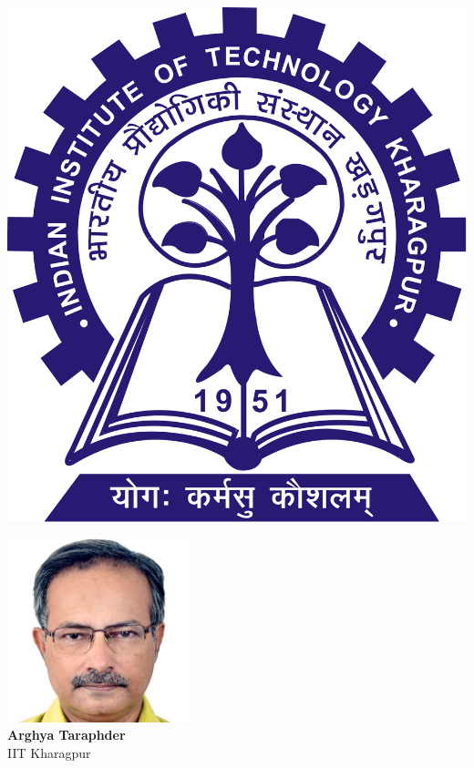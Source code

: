 \documentclass[aspectratio=169,t]{beamer}
\begin{document}
\begin{frame}{}
\hspace*{\fill}
\begin{minipage}{0.1\textwidth}
	\includegraphics[width=\textwidth]{IITKGP.png}\\
\end{minipage}
\hspace*{\fill}
\begin{minipage}{0.3\textwidth}
	\centering
	\includegraphics[width=0.4\textwidth]{arghya.jpg}\\
	\footnotesize{{\bf Arghya Taraphder}\\
	IIT Kharagpur}
\end{minipage}
\hspace*{\fill}
\begin{minipage}{0.3\textwidth}

\end{minipage}
\end{frame}
\end{document}
